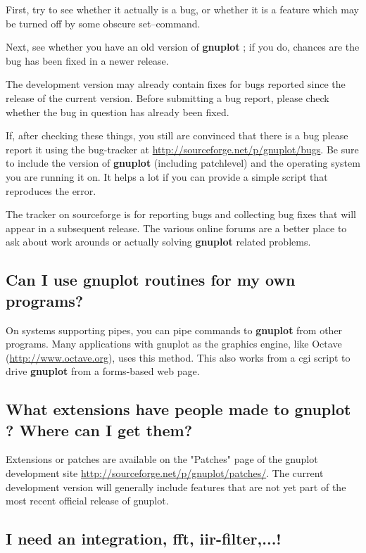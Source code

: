 \documentclass[a4paper,11pt]{article}
\def\http#1{{\small\href{http://#1}{\url{http://#1}}}}
\newcommand{\http}[1]%
            {\htmladdnormallink{\latex{\url{http://#1}}%
                    \html{\textit{http://#1}}}%
                {http://#1}%
            }
\newcommand{\gnuplot}{\textbf{gnuplot }}
\begin{document}
First, try to see whether it actually is a bug, or whether it
is a feature which may be turned off by some obscure set--command.

Next, see whether you have an old version of \gnuplot; if you do,
chances are the bug has been fixed in a newer release.

The development version may already contain fixes for bugs reported
since the release of the current version.
Before submitting a bug report, please check whether the bug in question
has already been fixed.

If, after checking these things, you still are convinced that there is a
bug please report it using the bug-tracker at
\http{sourceforge.net/p/gnuplot/bugs}.
Be sure to include the version of \gnuplot (including patchlevel) and 
the operating system you are running it on.
It helps a lot if you can provide a simple script that reproduces the error.

The tracker on sourceforge is for reporting bugs and collecting bug fixes
that will appear in a subsequent release.
The various online forums are a better place to ask about
work arounds or actually solving \gnuplot related problems.


\subsection{Can I use \gnuplot routines for my own programs?}

On systems supporting pipes, you can pipe commands to \gnuplot from other
programs. Many applications with gnuplot as the graphics engine, like Octave
(\http{www.octave.org}), uses this method. This also works from a cgi script to
drive \gnuplot from a forms-based web page.

\subsection{What extensions have people made to \gnuplot? Where can I get
them?}

Extensions or patches are available on the "Patches" page of the
gnuplot development site
\http{sourceforge.net/p/gnuplot/patches/}.
The current development version will generally include features that are
not yet part of the most recent official release of gnuplot.

\subsection{I need an integration, fft, iir-filter,...!}
\end{document}
